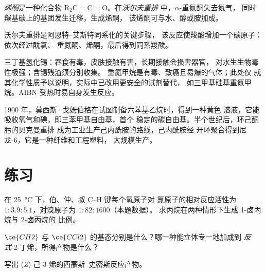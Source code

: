 \begin{definition}[烯酮与沃尔夫重排]\label{def:b3:radicals-carbenes:wolff}
\emph{烯酮}是一种化合物 $\mathrm{R_2C{=}C{=}O}$。在\emph{沃尔夫重排}
中，$\alpha$-重氮酮失去氮气，
同时羰基碳上的基团发生迁移，生成烯酮，
该烯酮可与水、醇或胺加成。
\end{definition}

沃尔夫重排是阿恩特–艾斯特同系化的关键步骤，
该反应使羧酸增加一个碳原子：依次经过酰氯、
重氮酮、烯酮，最后得到同系羧酸。

\begin{safety}{}
三丁基氢化锡：吞食有毒，皮肤接触有害，长期接触会损害器官，
对水生生物毒性极强；含锡残渣须分别收集。
重氮甲烷是有毒、致癌且易爆的气体；此处仅
就其化学性质予以说明，实际中已改用更安全的试剂替代，
如三甲基硅基重氮甲烷。AIBN 受热时易自身发生反应。
\end{safety}

\begin{history}
1900 年，莫西斯·戈姆伯格在试图制备六苯基乙烷时，得到一种黄色
溶液，它能吸收氧气和碘，即三苯甲基自由基，首个
稳定的碳自由基。半个世纪后，环己酮肟的贝克曼重排
成为工业生产己内酰胺的路线，己内酰胺经
开环聚合得到尼龙-6，它是一种纤维和工程塑料，
大规模生产。
\end{history}

\section{练习}

\begin{exercise}[$\star$]\label{exo:b3:radicals-carbenes:1}
在 \qty{25}{\celsius} 下，伯、仲、叔 C--H 键每个氢原子对
氯原子的相对反应活性为 $1 : 3.9 : 5.1$，对溴原子为 $1 : 82 : 1600$（本题数据）。
求丙烷在两种情形下生成 1-卤丙烷与 2-卤丙烷的
比例。
\end{exercise}

\begin{exercise}[$\star$]\label{exo:b3:radicals-carbenes:2}
$\ce{CH2}$ 与 $\ce{CCl2}$ 的基态分别是什么？哪一种能立体专一地加成到
\textit{反式}-2-丁烯，所得产物是什么？
\end{exercise}

\begin{exercise}[$\star$]\label{exo:b3:radicals-carbenes:3}
写出 (\textit{Z})-己-3-烯的西蒙斯–史密斯反应产物。
\end{exercise}

